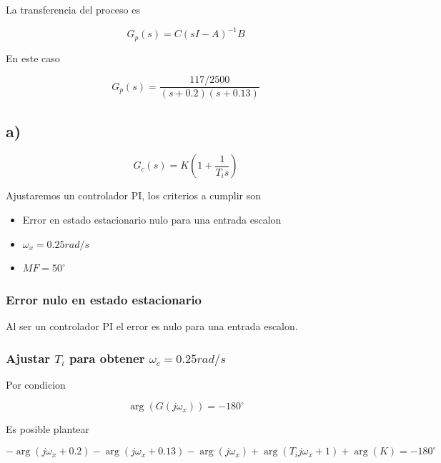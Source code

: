 \documentclass{article}
\begin{document}
        La transferencia del proceso es 

        \begin{equation}
            G_p(s) = C(sI-A)^{-1}B
        \end{equation}

        En este caso 

        \begin{equation}
            G_p(s) = \frac{117/2500}{(s+0.2)(s+0.13)}
        \end{equation}

        \subsection{a)}

        \begin{equation}
            G_c(s) = K \left( 1 + \frac{1}{T_i s} \right)
        \end{equation}

        Ajustaremos un controlador PI, los criterios a cumplir son 

        \begin{itemize}
            \item Error en estado estacionario nulo para una entrada escalon
            \item $\omega_x=0.25 rad/s$
            \item $MF=50^\circ$
        \end{itemize}

        \subsubsection{Error nulo en estado estacionario}

        Al ser un controlador PI el error es nulo para una entrada escalon.

        \subsubsection{Ajustar $T_i$ para obtener $\omega_c=0.25rad/s$}

        Por condicion 

        \begin{equation}
            \arg( G(j\omega_x) )= -180^\circ
        \end{equation}

        Es posible plantear 

        \begin{equation}
            -\arg( j\omega_x + 0.2 ) - \arg( j\omega_x + 0.13 ) - \arg( j\omega_x ) + \arg( T_ij\omega_x + 1 ) + \arg( K ) = -180^{\circ}
        \end{equation}
\end{document}
